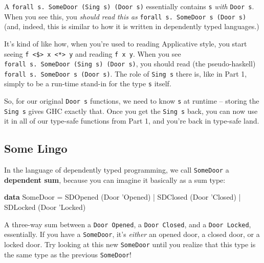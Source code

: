 \documentclass[]{article}
\newenvironment{Shaded}{}{}
\newcommand{\KeywordTok}[1]{\textcolor[rgb]{0.00,0.44,0.13}{\textbf{#1}}}
\newcommand{\DataTypeTok}[1]{\textcolor[rgb]{0.56,0.13,0.00}{#1}}
\newcommand{\CharTok}[1]{\textcolor[rgb]{0.25,0.44,0.63}{#1}}
\newcommand{\FunctionTok}[1]{\textcolor[rgb]{0.02,0.16,0.49}{#1}}
\newcommand{\NormalTok}[1]{#1}
\begin{document}
A \texttt{forall\ s.\ SomeDoor\ (Sing\ s)\ (Door\ s)} essentially contains
\texttt{s} \emph{with} \texttt{Door\ s}. When you see this, you \emph{should
read this as} \texttt{forall\ s.\ SomeDoor\ s\ (Door\ s)} (and, indeed, this is
similar to how it is written in dependently typed languages.)

It's kind of like how, when you're used to reading Applicative style, you start
seeing \texttt{f\ \textless{}\$\textgreater{}\ x\ \textless{}*\textgreater{}\ y}
and reading \texttt{f\ x\ y}. When you see
\texttt{forall\ s.\ SomeDoor\ (Sing\ s)\ (Door\ s)}, you should read (the
pseudo-haskell) \texttt{forall\ s.\ SomeDoor\ s\ (Door\ s)}. The role of
\texttt{Sing\ s} there is, like in Part 1, simply to be a run-time stand-in for
the type \texttt{s} itself.

So, for our original \texttt{Door\ s} functions, we need to know \texttt{s} at
runtime -- storing the \texttt{Sing\ s} gives GHC exactly that. Once you get the
\texttt{Sing\ s} back, you can now use it in all of our type-safe functions from
Part 1, and you're back in type-safe land.

\subsection{Some Lingo}\label{some-lingo}

In the language of dependently typed programming, we call \texttt{SomeDoor} a
\textbf{dependent sum}, because you can imagine it basically as a sum type:

\begin{Shaded}
\begin{Highlighting}[]
\KeywordTok{data} \DataTypeTok{SomeDoor} \FunctionTok{=} \DataTypeTok{SDOpened}\NormalTok{ (}\DataTypeTok{Door} \CharTok{'Opened)}
              \FunctionTok{|} \DataTypeTok{SDClosed}\NormalTok{ (}\DataTypeTok{Door} \CharTok{'Closed)}
              \FunctionTok{|} \DataTypeTok{SDLocked}\NormalTok{ (}\DataTypeTok{Door} \CharTok{'Locked)}
\end{Highlighting}
\end{Shaded}

A three-way sum between a \texttt{Door\ \textquotesingle{}Opened}, a
\texttt{Door\ \textquotesingle{}Closed}, and a
\texttt{Door\ \textquotesingle{}Locked}, essentially. If you have a
\texttt{SomeDoor}, it's \emph{either} an opened door, a closed door, or a locked
door. Try looking at this new \texttt{SomeDoor} until you realize that this type
is the same type as the previous \texttt{SomeDoor}!
\end{document}
